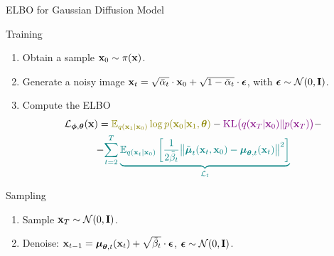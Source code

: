 \documentclass{beamer}
\begin{document}
\begin{frame}{ELBO for Gaussian Diffusion Model}
    \begin{block}{Training}
        \begin{enumerate}
            \item Obtain a sample $\mathbf{x}_0 \sim \pi(\mathbf{x})$.
            \item Generate a noisy image $\mathbf{x}_t = \sqrt{\bar{\alpha}_t} \cdot \mathbf{x}_0 + \sqrt{1 - \bar{\alpha}_t} \cdot \boldsymbol{\epsilon}$, with $\boldsymbol{\epsilon} \sim \mathcal{N}(0, \mathbf{I})$.
            \item Compute the ELBO
            \vspace{-0.3cm}
            \begin{multline*}
                \cL_{\bphi, \btheta}(\bx) =  {\color{olive}\bbE_{q(\bx_1 | \bx_0)} \log p(\bx_0 | \bx_1, \btheta)} - {\color{violet}\KL\bigl(q(\bx_T | \bx_0) \| p(\bx_T)\bigr)} - \\
                - {\color{teal}\sum_{t=2}^T \underbrace{ \bbE_{q(\bx_t | \bx_0)} \left[\frac{1}{2\tilde{\beta}_t} \bigl\| \tilde{\bmu}_t(\bx_t, \bx_0) - \bmu_{\btheta, t}(\bx_t) \bigr\|^2  \right]}_{\cL_t}}
            \end{multline*}
            \vspace{-0.7cm}
        \end{enumerate}
    \end{block}
    \eqpause
    \begin{block}{Sampling}
        \begin{enumerate}
            \item Sample $\mathbf{x}_T \sim \mathcal{N}(0, \mathbf{I})$.
            \item Denoise: $\mathbf{x}_{t - 1} = \boldsymbol{\mu}_{\boldsymbol{\theta}, t}(\mathbf{x}_t) +  \sqrt{\tilde{\beta}_t} \cdot \boldsymbol{\epsilon}$, $\boldsymbol{\epsilon} \sim \mathcal{N}(0, \mathbf{I})$.
        \end{enumerate}
    \end{block}
\end{frame}
\end{document}
